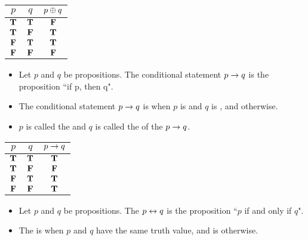     \begin{center}
      \begin{tabular}{|c|c|c|}
        \hline
        $p$ & $q$ & $p \oplus q$ \\
        \hline
        $\mathbf{T}$ & $\mathbf{T}$ & $\mathbf{F}$ \\
        \hline
        $\mathbf{T}$ & $\mathbf{F}$ & $\mathbf{T}$ \\
        \hline
        $\mathbf{F}$ & $\mathbf{T}$ & $\mathbf{T}$ \\
        \hline
        $\mathbf{F}$ & $\mathbf{F}$ & $\mathbf{F}$ \\
        \hline
      \end{tabular}
    \end{center}

      \begin{itemize}
        \item Let $p$ and $q$ be propositions. The conditional statement $p \rightarrow q$ is the proposition ``if p, then q".
        \item The conditional statement $p \rightarrow q$ is  when $p$
        is  and $q$ is , and  otherwise.
        \item $p$ is called the  and $q$ is called the  of the  $p \rightarrow q$. \fnmark
      \end{itemize}

      \begin{center}
        \begin{tabular}{|c|c|c|}
          \hline
          $p$ & $q$ & $p \rightarrow q$ \\
          \hline
          $\mathbf{T}$ & $\mathbf{T}$ & $\mathbf{T}$ \\
          \hline
          $\mathbf{T}$ & $\mathbf{F}$ & $\mathbf{F}$ \\
          \hline
          $\mathbf{F}$ & $\mathbf{T}$ & $\mathbf{T}$ \\
          \hline
          $\mathbf{F}$ & $\mathbf{F}$ & $\mathbf{T}$ \\
          \hline
        \end{tabular}
      \end{center}

      \begin{itemize}
        \item Let $p$ and $q$ be propositions. The 
        $p \leftrightarrow q$ is the proposition ``$p$ if and only if $q$".
        \item The  is  when $p$ and $q$ have the same
        truth value, and is  otherwise.
      \end{itemize}


